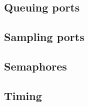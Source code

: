    \subsection{Queuing ports}
   

   \subsection{Sampling ports}
   

   \subsection{Semaphores}
   

   \subsection{Timing}
   

